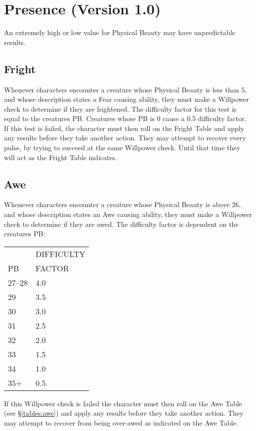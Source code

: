 \section{Presence (Version 1.0)}

An extremely high or low value for Physical Beauty may have
unpredictable results.

\subsection{Fright}
Whenever characters encounter a creature whose Physical Beauty is less
than 5, and whose description states a Fear causing ability, they must
make a Willpower check to determine if they are frightened. The
difficulty factor for this test is equal to the creatures
PB. Creatures whose PB is 0 cause a 0.5 difficulty factor.  If this
test is failed, the character must then roll on the Fright Table and
apply any results before they take another action.  They may attempt
to recover every pulse, by trying to succeed at the same Willpower
check.  Until that time they will act as the Fright Table indicates.

\subsection{Awe}
Whenever characters encounter a creature whose Physical Beauty is
above 26, and whose description states an Awe causing ability, they
must make a Willpower check to determine if they are awed. The
difficulty factor is dependent on the creatures PB:

\begin{tabular}{ll}
	& DIFFICULTY \\
PB	& FACTOR \\
27--28	& 4.0 \\
29	& 3.5 \\
30	& 3.0 \\
31	& 2.5 \\
32	& 2.0 \\
33	& 1.5 \\
34	& 1.0 \\
35+	& 0.5 \\
\end{tabular}

If this Willpower check is failed the character must then roll on the
Awe Table (see \S\ref{tables:awe}) and apply any results before they
take another action.  They may attempt to recover from being over-awed
as indicated on the Awe Table.

